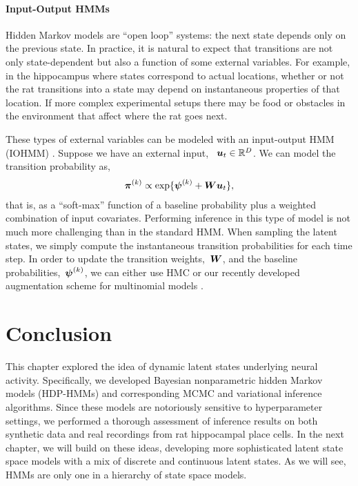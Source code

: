\paragraph{Input-Output HMMs}
Hidden Markov models are ``open loop'' systems: the next state 
depends only on the previous state.  In practice, it is natural to 
expect that transitions are not only state-dependent but also a 
function of some external variables. For example, in the hippocampus 
where states correspond to actual locations, whether or not the 
rat transitions into a state may depend on instantaneous properties 
of that location. If more complex experimental setups there may 
be food or obstacles in the environment that affect where the rat 
goes next. 

These types of external variables can be modeled with an input-output 
HMM (IOHMM) \citep{bengio1995input}. Suppose we have an external input,
~$\boldsymbol{u}_t \in \mathbb{R}^D$. We can model the transition probability as,
\begin{align*}
\boldsymbol{\pi}^{(k)} &\propto \exp\{\boldsymbol{\psi}^{(k)} + \boldsymbol{W} \boldsymbol{u}_t\}, \\
\end{align*}
that is, as a ``soft-max'' function of a baseline probability plus a 
weighted combination of input covariates.  Performing inference in this 
type of model is not much more challenging than in the standard HMM.
When sampling the latent states, we simply compute the instantaneous
transition probabilities for each time step. In order to update the 
transition weights,~$\boldsymbol{W}$, and the baseline probabilities,~$\boldsymbol{\psi}^{(k)}$,
we can either use HMC or our recently developed \polyagamma augmentation scheme for multinomial
models \citep{linderman2015dependent}.


\section{Conclusion}
This chapter explored the idea of dynamic latent states underlying
neural activity. Specifically, we developed Bayesian nonparametric
hidden Markov models (HDP-HMMs) and corresponding MCMC and variational
inference algorithms. Since these models are notoriously sensitive to
hyperparameter settings, we performed a thorough assessment of
inference results on both synthetic data and real recordings from rat
hippocampal place cells.  In the next chapter, we will build on these
ideas, developing more sophisticated latent state space models with a
mix of discrete and continuous latent states. As we will see, HMMs are
only one in a hierarchy of state space models.

